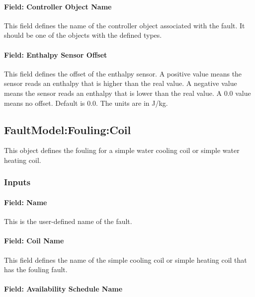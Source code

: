 \paragraph{Field: Controller Object Name}\label{field-controller-object-name-4}

This field defines the name of the controller object associated with the fault. It should be one of the objects with the defined types.

\paragraph{Field: Enthalpy Sensor Offset}\label{field-enthalpy-sensor-offset-1}

This field defines the offset of the enthalpy sensor. A positive value means the sensor reads an enthalpy that is higher than the real value. A negative value means the sensor reads an enthalpy that is lower than the real value. A 0.0 value means no offset. Default is 0.0. The units are in J/kg.

\subsection{FaultModel:Fouling:Coil}\label{faultmodelfoulingcoil}

This object defines the fouling for a simple water cooling coil or simple water heating coil.

\subsubsection{Inputs}\label{inputs-5-018}

\paragraph{Field: Name}\label{field-name-5-014}

This is the user-defined name of the fault.

\paragraph{Field: Coil Name}\label{field-coil-name-001}

This field defines the name of the simple cooling coil or simple heating coil that has the fouling fault.

\paragraph{Field: Availability Schedule Name}\label{field-availability-schedule-name-5-002}

